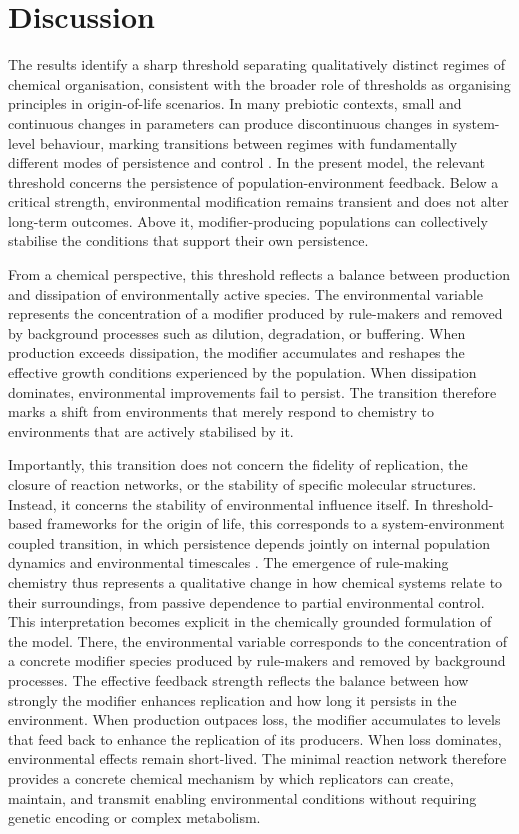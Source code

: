 \section*{Discussion}

The results identify a sharp threshold separating qualitatively distinct regimes of chemical organisation, consistent with the broader role of thresholds as organising principles in origin-of-life scenarios. In many prebiotic contexts, small and continuous changes in parameters can produce discontinuous changes in system-level behaviour, marking transitions between regimes with fundamentally different modes of persistence and control \cite{Jeancolas2020Threshold}. In the present model, the relevant threshold concerns the persistence of population-environment feedback. Below a critical strength, environmental modification remains transient and does not alter long-term outcomes. Above it, modifier-producing populations can collectively stabilise the conditions that support their own persistence.

From a chemical perspective, this threshold reflects a balance between production and dissipation of environmentally active species. The environmental variable represents the concentration of a modifier produced by rule-makers and removed by background processes such as dilution, degradation, or buffering. When production exceeds dissipation, the modifier accumulates and reshapes the effective growth conditions experienced by the population. When dissipation dominates, environmental improvements fail to persist. The transition therefore marks a shift from environments that merely respond to chemistry to environments that are actively stabilised by it.

Importantly, this transition does not concern the fidelity of replication, the closure of reaction networks, or the stability of specific molecular structures. Instead, it concerns the stability of environmental influence itself. In threshold-based frameworks for the origin of life, this corresponds to a system-environment coupled transition, in which persistence depends jointly on internal population dynamics and environmental timescales \cite{Jeancolas2020Threshold}. The emergence of rule-making chemistry thus represents a qualitative change in how chemical systems relate to their surroundings, from passive dependence to partial environmental control. This interpretation becomes explicit in the chemically grounded formulation of the model. There, the environmental variable corresponds to the concentration of a concrete modifier species produced by rule-makers and removed by background processes. The effective feedback strength reflects the balance between how strongly the modifier enhances replication and how long it persists in the environment. When production outpaces loss, the modifier accumulates to levels that feed back to enhance the replication of its producers. When loss dominates, environmental effects remain short-lived. The minimal reaction network therefore provides a concrete chemical mechanism by which replicators can create, maintain, and transmit enabling environmental conditions without requiring genetic encoding or complex metabolism.

